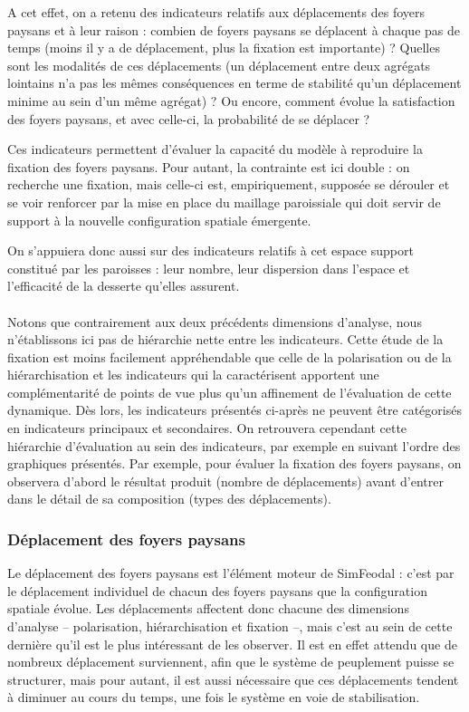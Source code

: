 A cet effet, on a retenu des indicateurs relatifs aux déplacements des foyers paysans et à leur raison :
combien de foyers paysans se déplacent à chaque pas de temps (moins il y a de déplacement, plus la fixation est importante) ? Quelles sont les modalités de ces déplacements (un déplacement entre deux agrégats lointains n'a pas les mêmes conséquences en terme de stabilité qu'un déplacement minime au sein d'un même agrégat) ? Ou encore, comment évolue la satisfaction des foyers paysans, et avec celle-ci, la probabilité de se déplacer ?

Ces indicateurs permettent d'évaluer la capacité du modèle à reproduire la fixation des foyers paysans.
Pour autant, la contrainte est ici double :
on recherche une fixation, mais celle-ci est, empiriquement, supposée se dérouler et se voir renforcer par la mise en place du maillage paroissiale qui doit servir de support à la nouvelle configuration spatiale émergente.

On s'appuiera donc aussi sur des indicateurs relatifs à cet espace support constitué par les paroisses :
leur nombre, leur dispersion dans l'espace et l'efficacité de la desserte qu'elles assurent.

\paragraph*{}Notons que contrairement aux deux précédents dimensions d'analyse, nous n'établissons ici pas de hiérarchie nette entre les indicateurs.
Cette étude de la fixation est moins facilement appréhendable que celle de la polarisation ou de la hiérarchisation et les indicateurs qui la caractérisent apportent une complémentarité de points de vue plus qu'un affinement de l'évaluation de cette dynamique.
Dès lors, les indicateurs présentés ci-après ne peuvent être catégorisés en indicateurs principaux et secondaires.
On retrouvera cependant cette hiérarchie d'évaluation au sein des indicateurs, par exemple en suivant l'ordre des graphiques présentés.
Par exemple, pour évaluer la fixation des foyers paysans, on observera d'abord le résultat produit (nombre de déplacements) avant d'entrer dans le détail de sa composition (types des déplacements).


\subsubsection{Déplacement des foyers paysans}

Le déplacement des foyers paysans est l'élément moteur de SimFeodal :
c'est par le déplacement individuel de chacun des foyers paysans que la configuration spatiale évolue.
Les déplacements affectent donc chacune des dimensions d'analyse -- polarisation, hiérarchisation et fixation --, mais c'est au sein de cette dernière qu'il est le plus intéressant de les observer.
Il est en effet attendu que de nombreux déplacement surviennent, afin que le système de peuplement puisse se structurer, mais pour autant, il est aussi nécessaire que ces déplacements tendent à diminuer au cours du temps, une fois le système en voie de stabilisation.

